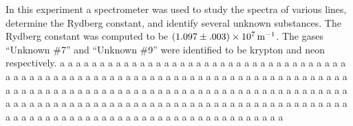 
\physics

\begin{paperabs}
In this experiment a spectrometer was used to study the spectra of various lines, determine the Rydberg constant, and identify several unknown substances.
The Rydberg constant was computed to be $(1.097\pm.003)\times\SI{E7}{\per\meter}$.
The gases ``Unknown \#7'' and ``Unknown \#9'' were identified to be krypton and neon respectively. a a a a a a a a a a a a a a a a a a a a a a a a a a a a a a a a a a a a a a a a a a a a a a a a a a a a a a a a a a a a a a a a a a a a a a a a a a a a a a a a a a a a a a a a a a a a a a a a a a a a a a a a a a a a a a a a a a a a a a a a a a a a a a a a a a a a a a a a a a a a a a a a a a a a a a a a a a a a a a a a a a a a a a a a a a a a a a a a a a a a a a a a a a a a a a a a a a a a a a a a
\end{paperabs}

